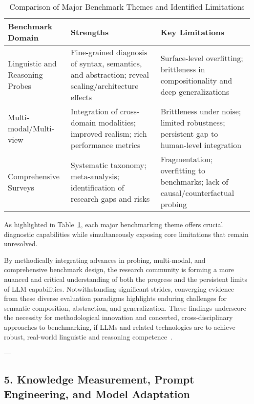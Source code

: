 \documentclass[11pt]{article}
\begin{document}
\begin{table}[ht]
    \centering
    \caption{Comparison of Major Benchmark Themes and Identified Limitations}
    \label{tab:benchmark_summary}
    \begin{tabular}{p{4cm}p{5cm}p{5cm}}
        \toprule
        \textbf{Benchmark Domain} & \textbf{Strengths} & \textbf{Key Limitations} \\
        \midrule
        Linguistic and Reasoning Probes & Fine-grained diagnosis of syntax, semantics, and abstraction; reveal scaling/architecture effects & Surface-level overfitting; brittleness in compositionality and deep generalizations \\
        \addlinespace
        Multi-modal/Multi-view & Integration of cross-domain modalities; improved realism; rich performance metrics & Brittleness under noise; limited robustness; persistent gap to human-level integration \\
        \addlinespace
        Comprehensive Surveys & Systematic taxonomy; meta-analysis; identification of research gaps and risks & Fragmentation; overfitting to benchmarks; lack of causal/counterfactual probing \\
        \bottomrule
    \end{tabular}
\end{table}

As highlighted in Table~\ref{tab:benchmark_summary}, each major benchmarking theme offers crucial diagnostic capabilities while simultaneously exposing core limitations that remain unresolved.

By methodically integrating advances in probing, multi-modal, and comprehensive benchmark design, the research community is forming a more nuanced and critical understanding of both the progress and the persistent limits of LLM capabilities. Notwithstanding significant strides, converging evidence from these diverse evaluation paradigms highlights enduring challenges for semantic composition, abstraction, and generalization. These findings underscore the necessity for methodological innovation and concerted, cross-disciplinary approaches to benchmarking, if LLMs and related technologies are to achieve robust, real-world linguistic and reasoning competence~\cite{reference92,reference94,reference96,reference97,reference98,reference99}.

---

\subsection{5. Knowledge Measurement, Prompt Engineering, and Model Adaptation}
\end{document}
